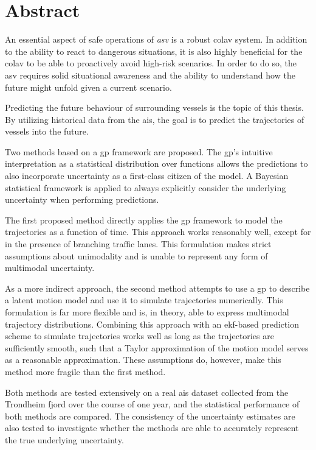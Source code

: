 \chapter*{Abstract}
An essential aspect of safe operations of \textit{\acrfull{asv}} is a robust \acrfull{colav} system. In addition to the ability to react to dangerous situations, it is also highly beneficial for the \acrshort{colav} to be able to proactively avoid high-risk scenarios. In order to do so, the \acrshort{asv} requires solid situational awareness and the ability to understand how the future might unfold given a current scenario. 

Predicting the future behaviour of surrounding vessels is the topic of this thesis. By utilizing historical data from the \acrfull{ais}, the goal is to predict the trajectories of vessels into the future. 

Two methods based on a \acrfull{gp} framework are proposed. The \acrshort{gp}'s intuitive interpretation as a statistical distribution over functions allows the predictions to also incorporate uncertainty as a first-class citizen of the model. A Bayesian statistical framework is applied to always explicitly consider the underlying uncertainty when performing predictions. 

The first proposed method directly applies the \acrshort{gp} framework to model the trajectories as a function of time. This approach works reasonably well, except for in the presence of branching traffic lanes. This formulation makes strict assumptions about unimodality and is unable to represent any form of multimodal uncertainty.

As a more indirect approach, the second method attempts to use a \acrshort{gp} to describe a latent motion model and use it to simulate trajectories numerically. This formulation is far more flexible and is, in theory, able to express multimodal trajectory distributions. Combining this approach with an \acrfull{ekf}-based prediction scheme to simulate trajectories works well as long as the trajectories are sufficiently smooth, such that a Taylor approximation of the motion model serves as a reasonable approximation. These assumptions do, however, make this method more fragile than the first method.

Both methods are tested extensively on a real \acrshort{ais} dataset collected from the Trondheim fjord over the course of one year, and the statistical performance of both methods are compared. The consistency of the uncertainty estimates are also tested to investigate whether the methods are able to accurately represent the true underlying uncertainty.